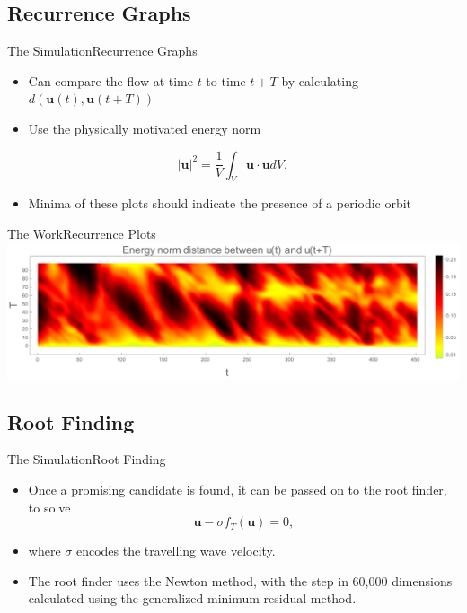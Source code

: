 \documentclass[10pt]{beamer}
\newcommand{\Vector}[1]{\mathbf{#1}}
\begin{document}
\subsection{Recurrence Graphs}
\begin{frame}{The Simulation}{Recurrence Graphs}
\begin{itemize}
\item<1-> Can compare the flow at time $t$ to time $t+T$ by calculating $d(\Vector{u}(t),\Vector{u}(t+T))$
\item<2-> Use the physically motivated energy norm
\end{itemize}
\pause
\begin{equation*}
|\Vector{u}|^2 = \frac{1}{V}\int_V{\Vector{u}\cdot\Vector{u}}{dV},
\end{equation*}
\begin{itemize}
\item<3-> Minima of these plots should indicate the presence of a periodic orbit
\end{itemize}
\end{frame}
\begin{frame}{The Work}{Recurrence Plots}
\includegraphics[scale = 0.3]{Data/RecPlot}
\end{frame}
\subsection{Root Finding}
\begin{frame}{The Simulation}{Root Finding}
\begin{itemize}
\item<1-> Once a promising candidate is found, it can be passed on to the root finder, to solve 
\begin{equation*}
\Vector{u} - \sigma f_T(\Vector{u}) = 0,
\end{equation*}
\item<2-> where $\sigma$ encodes the travelling wave velocity.
\item<3-> The root finder uses the Newton method, with the step in 60,000 dimensions calculated using the generalized minimum residual method.  
\end{itemize}
\end{frame}
\end{document}

